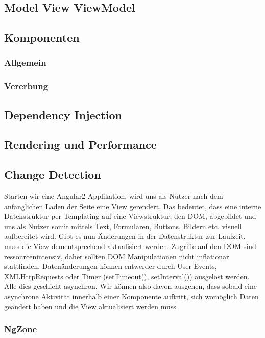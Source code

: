 \subsection{Model View ViewModel}
\subsection{Komponenten}
\subsubsection{Allgemein}
\subsubsection{Vererbung}

\subsection{Dependency Injection}
\subsection{Rendering und Performance}

\subsection{Change Detection}

Starten wir eine Angular2 Applikation, wird uns als Nutzer nach dem anfänglichen Laden der Seite eine View gerendert.
Das bedeutet, dass eine interne Datenstruktur per Templating auf eine Viewstruktur, den DOM, abgebildet und uns als Nutzer somit mittels Text,
Formularen, Buttons, Bildern etc. visuell aufbereitet wird.
Gibt es nun Änderungen in der Datenstruktur zur Laufzeit, muss die View dementsprechend aktualisiert werden.
Zugriffe auf den DOM sind ressourcenintensiv, daher sollten DOM Manipulationen nicht inflationär stattfinden.
Datenänderungen können entwerder durch User Events, XMLHttpRequests oder Timer (setTimeout(), setInterval()) ausgelöst werden.
Alle dies geschieht asynchron. Wir können also davon ausgehen, dass sobald eine asynchrone Aktivität innerhalb einer Komponente auftritt,
sich womöglich Daten geändert haben und die View aktualisiert werden muss.
\cite{changedetection-explained}

\subsubsection{NgZone}

